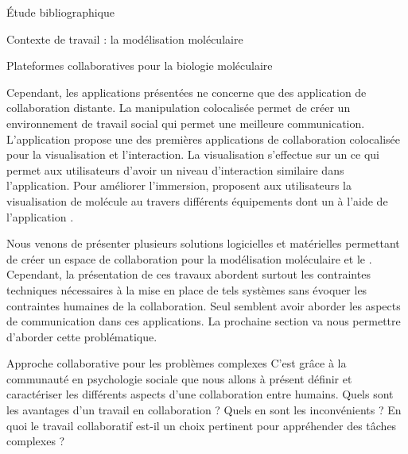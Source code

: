 \documentclass[myfrancais,ngerman,english,french]{mythesis}
\begin{document}
\begin{mychapter}{Étude bibliographique}
\begin{mysection}{Contexte de travail : la modélisation moléculaire}
\begin{mysubsection}{Plateformes collaboratives pour la biologie moléculaire}
				\begin{myfigure}
				\end{myfigure}

				Cependant, les applications présentées ne concerne que des application de collaboration distante.
				La manipulation colocalisée permet de créer un environnement de travail social qui permet une meilleure communication.
				L'application \myPaulingWorld {} propose une des premières applications de collaboration colocalisée pour la visualisation et l'interaction.
				La visualisation s'effectue sur un \myWorkbench ce qui permet aux utilisateurs d'avoir un niveau d'interaction similaire dans l'application.
				Pour améliorer l'immersion,  proposent aux utilisateurs la visualisation de molécule au travers différents équipements dont un \myCAVE à l'aide de l'application \myDIVERSE.

				Nous venons de présenter plusieurs solutions logicielles et matérielles permettant de créer un espace de collaboration pour la modélisation moléculaire et le .
				Cependant, la présentation de ces travaux abordent surtout les contraintes techniques nécessaires à la mise en place de tels systèmes sans évoquer les contraintes humaines de la collaboration.
				Seul  semblent avoir aborder les aspects de communication dans ces applications.
				La prochaine section va nous permettre d'aborder cette problématique.
			\end{mysubsection}
		\end{mysection}
		\begin{mysection}{Approche collaborative pour les problèmes complexes}
			C'est grâce à la communauté en psychologie sociale que nous allons à présent définir et caractériser les différents aspects d'une collaboration entre humains.
			Quels sont les avantages d'un travail en collaboration ?
			Quels en sont les inconvénients ?
			En quoi le travail collaboratif est-il un choix pertinent pour appréhender des tâches complexes ?


\end{mysection}
\end{mychapter}
\end{document}
